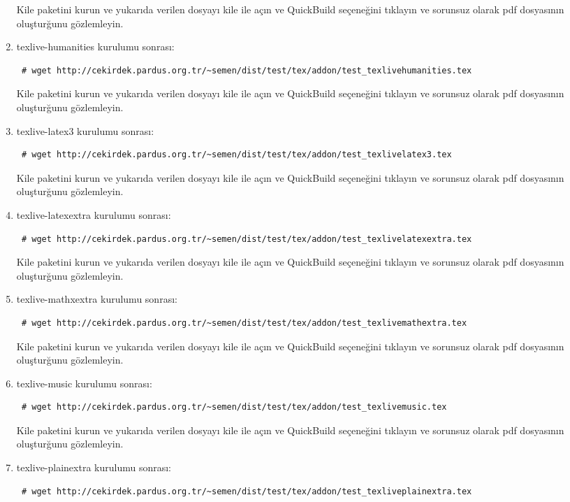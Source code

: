 \documentclass[a4paper,10pt]{article}
\begin{document}
\begin{enumerate}
Kile paketini kurun ve yukarıda verilen dosyayı kile ile açın ve QuickBuild  seçeneğini tıklayın ve sorunsuz olarak pdf dosyasının oluşturğunu gözlemleyin.

\item texlive-humanities kurulumu sonrası:
\begin{verbatim}
 # wget http://cekirdek.pardus.org.tr/~semen/dist/test/tex/addon/test_texlivehumanities.tex
\end{verbatim}

Kile paketini kurun ve yukarıda verilen dosyayı kile ile açın ve QuickBuild  seçeneğini tıklayın ve sorunsuz olarak pdf dosyasının oluşturğunu gözlemleyin.

\item texlive-latex3 kurulumu sonrası:
\begin{verbatim}
 # wget http://cekirdek.pardus.org.tr/~semen/dist/test/tex/addon/test_texlivelatex3.tex
\end{verbatim}

Kile paketini kurun ve yukarıda verilen dosyayı kile ile açın ve QuickBuild  seçeneğini tıklayın ve sorunsuz olarak pdf dosyasının oluşturğunu gözlemleyin.
\item texlive-latexextra kurulumu sonrası:
\begin{verbatim}
 # wget http://cekirdek.pardus.org.tr/~semen/dist/test/tex/addon/test_texlivelatexextra.tex
\end{verbatim}

Kile paketini kurun ve yukarıda verilen dosyayı kile ile açın ve QuickBuild  seçeneğini tıklayın ve sorunsuz olarak pdf dosyasının oluşturğunu gözlemleyin.
\item texlive-mathxextra kurulumu sonrası:
\begin{verbatim}
 # wget http://cekirdek.pardus.org.tr/~semen/dist/test/tex/addon/test_texlivemathextra.tex
\end{verbatim}

Kile paketini kurun ve yukarıda verilen dosyayı kile ile açın ve QuickBuild  seçeneğini tıklayın ve sorunsuz olarak pdf dosyasının oluşturğunu gözlemleyin.

\item texlive-music kurulumu sonrası:
\begin{verbatim}
 # wget http://cekirdek.pardus.org.tr/~semen/dist/test/tex/addon/test_texlivemusic.tex
\end{verbatim}

Kile paketini kurun ve yukarıda verilen dosyayı kile ile açın ve QuickBuild  seçeneğini tıklayın ve sorunsuz olarak pdf dosyasının oluşturğunu gözlemleyin.
\item texlive-plainextra kurulumu sonrası:
\begin{verbatim}
 # wget http://cekirdek.pardus.org.tr/~semen/dist/test/tex/addon/test_texliveplainextra.tex
\end{verbatim}


\end{enumerate}
\end{document}
